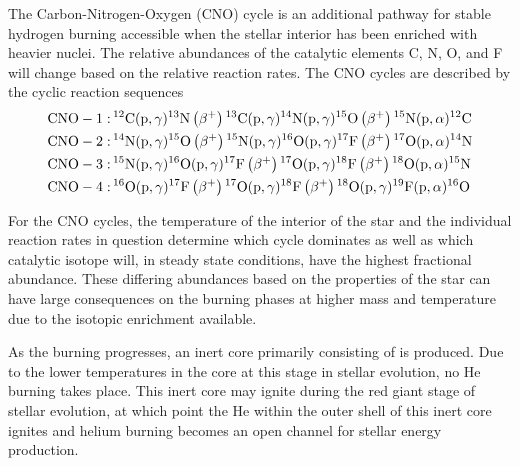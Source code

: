 The Carbon-Nitrogen-Oxygen (CNO) cycle is an additional pathway for stable
hydrogen burning accessible when the stellar interior has been enriched with
heavier nuclei. The relative abundances of the catalytic elements C, N, O, and
F will change based on the relative reaction rates. The CNO cycles are
described by the cyclic reaction sequences
\begin{align*}
    \rm{CNO-1:\,}& {}^{12}\textrm{C}(\rm{p},\gamma){}^{13}\textrm{N}
        \left(\beta^+\right){}^{13}\textrm{C}(\rm{p},\gamma)
            {}^{14}\textrm{N}(\rm{p},\gamma){}^{15}\textrm{O}
        \left(\beta^+\right){}^{15}\textrm{N}(\rm{p},\alpha){}^{12}\textrm{C} \\
    \rm{CNO-2:\,}& {}^{14}\textrm{N}(\rm{p},\gamma){}^{15}\textrm{O}
        \left(\beta^+\right){}^{15}\textrm{N}(\rm{p},\gamma)
        {}^{16}\textrm{O}(\rm{p},\gamma){}^{17}\textrm{F}\left(\beta^+\right)
        {}^{17}\textrm{O}(\rm{p},\alpha){}^{14}\textrm{N} \\
    \rm{CNO-3:\,}& {}^{15}\textrm{N}(\rm{p},\gamma)
        {}^{16}\textrm{O}(\rm{p},\gamma){}^{17}\textrm{F}\left(\beta^+\right)
        {}^{17}\textrm{O}(\rm{p},\gamma){}^{18}\textrm{F}\left(\beta^+\right)
        {}^{18}\textrm{O}(\rm{p},\alpha){}^{15}\textrm{N} \\
    \rm{CNO-4:\,}& {}^{16}\textrm{O}(\rm{p},\gamma){}^{17}\textrm{F}\left(\beta^+\right)
        {}^{17}\textrm{O}(\rm{p},\gamma){}^{18}\textrm{F}\left(\beta^+\right)
        {}^{18}\textrm{O}(\rm{p},\gamma)
            {}^{19}\textrm{F}(\rm{p},\alpha){}^{16}\textrm{O}
\end{align*}

For the CNO cycles, the temperature of the interior of the star and the
individual reaction rates in question determine which cycle dominates as well
as which catalytic isotope will, in steady state conditions, have the highest
fractional abundance. These differing abundances based on the properties of the
star can have large consequences on the burning phases at higher mass and
temperature due to the isotopic enrichment available.

As the burning progresses, an inert core primarily consisting of  is
produced. Due to the lower temperatures in the core at this stage in stellar
evolution, no He burning takes place. This inert core may ignite during the
red giant stage of stellar evolution, at which point the He within the outer
shell of this inert core ignites and helium burning becomes an open channel
for stellar energy production.

